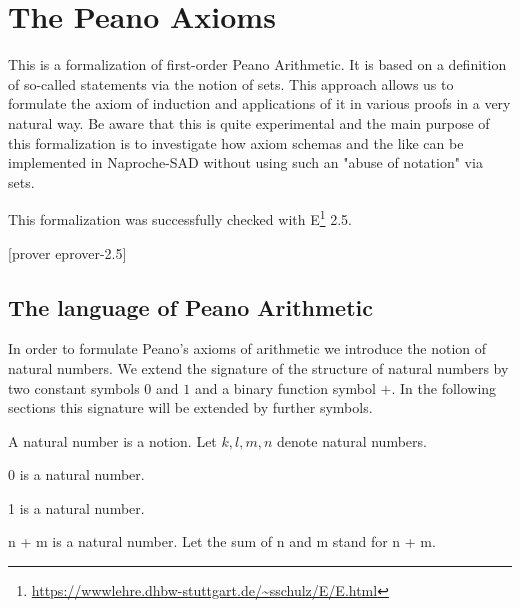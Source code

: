 \section{The Peano Axioms}
This is a formalization of first-order Peano Arithmetic. It is based on a
definition of so-called statements via the notion of sets. This approach allows
us to formulate the axiom of induction and applications of it in various proofs
in a very natural way. Be aware that this is quite experimental and the main
purpose of this formalization is to investigate how axiom schemas and the like
can be implemented in Naproche-SAD without using such an "abuse of notation" via
sets.

This formalization was successfully checked with
E\footnote{\url{https://wwwlehre.dhbw-stuttgart.de/~sschulz/E/E.html}} 2.5.

\begin{forthel}

[prover eprover-2.5]
\end{forthel}

\subsection{The language of Peano Arithmetic}
In order to formulate Peano's axioms of arithmetic we introduce the notion of
natural numbers. We extend the signature of the structure of natural numbers by
two constant symbols $0$ and $1$ and a binary function symbol $+$. In the
following sections this signature will be extended by further symbols.

\begin{forthel}
\begin{signature}[0101]
A natural number is a notion. Let $k,l,m,n$ denote natural
numbers.
\end{signature}

\begin{signature}[0102]
0 is a natural number.
\end{signature}

\begin{signature}[0103]
1 is a natural number.
\end{signature}

\begin{signature}[0104]
n + m is a natural number. Let the sum of n and m stand for
n + m.
\end{signature}
\end{forthel}


